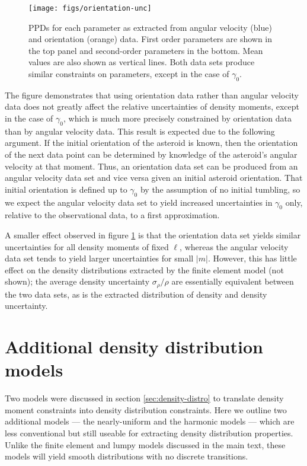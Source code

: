\begin{figure}
  \centering
  \texttt{[image: figs/orientation-unc]}
  \caption{PPDs for each parameter as extracted from angular velocity (blue) and orientation (orange) data. First order parameters are shown in the top panel and second-order parameters in the bottom. Mean values are also shown as vertical lines. Both data sets produce similar constraints on parameters, except in the case of $\gamma_0$.}
  \label{fig:orientation-unc}
\end{figure}

The figure demonstrates that using orientation data rather than angular velocity data does not greatly affect the relative uncertainties of density moments, except in the case of $\gamma_0$, which is much more precisely constrained by orientation data than by angular velocity data. This result is expected due to the following argument. If the initial orientation of the asteroid is known, then the orientation of the next data point can be determined by knowledge of the asteroid's angular velocity at that moment. Thus, an orientation data set can be produced from an angular velocity data set and vice versa given an initial asteroid orientation. That initial orientation is defined up to $\gamma_0$ by the assumption of no initial tumbling, so we expect the angular velocity data set to yield increased uncertainties in $\gamma_0$ only, relative to the observational data, to a first approximation.

A smaller effect observed in figure \ref{fig:orientation-unc} is that the orientation data set yields similar uncertainties for all density moments of fixed $\ell$, whereas the angular velocity data set tends to yield larger uncertainties for small $|m|$. However, this has little effect on the density distributions extracted by the finite element model (not shown); the average density uncertainty $\sigma_\rho / \rho$ are essentially equivalent between the two data sets, as is the extracted distribution of density and density uncertainty.




\section{Additional density distribution models}
\label{app:more-models}

Two models were discussed in section \ref{sec:density-distro} to translate density moment constraints into density distribution constraints. Here we outline two additional models --- the nearly-uniform and the harmonic models --- which are less conventional but still useable for extracting density distribution properties. Unlike the finite element and lumpy models discussed in the main text, these models will yield smooth distributions with no discrete transitions.

